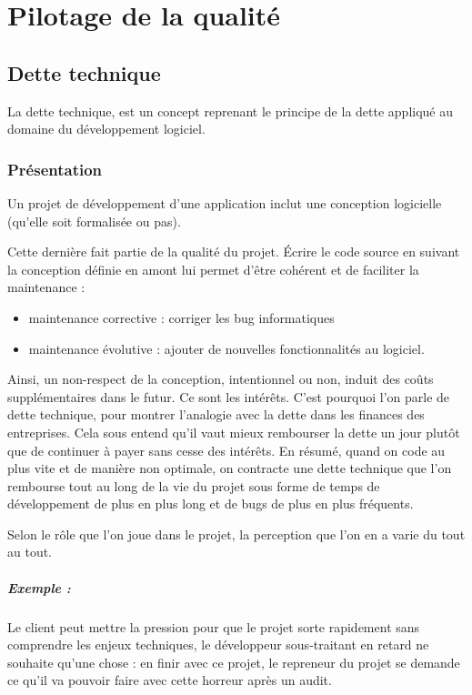 \chapter{Pilotage de la qualité}

% 

\section{Dette technique}
La dette technique, est un concept reprenant le principe de la dette appliqué au domaine du développement logiciel.

\subsection{Présentation}

Un projet de développement d'une application inclut une conception logicielle (qu'elle soit formalisée ou pas).

Cette dernière fait partie de la qualité du projet. Écrire le code source en suivant la conception définie en amont lui permet d'être cohérent et de faciliter la maintenance :

\begin{itemize}
\item maintenance corrective : corriger les bug informatiques
\item maintenance évolutive : ajouter de nouvelles fonctionnalités au logiciel. 
\end{itemize}

Ainsi, un non-respect de la conception, intentionnel ou non, induit des coûts supplémentaires dans le futur. 
Ce sont les intérêts. C'est pourquoi l'on parle de dette technique, pour montrer l'analogie avec la dette dans les finances des entreprises. 
Cela sous entend qu'il vaut mieux rembourser la dette un jour plutôt que de continuer à payer sans cesse des intérêts.
\jumpTwo
En résumé, quand on code au plus vite et de manière non optimale, on contracte une dette technique que l'on rembourse tout au long de la vie du projet sous forme de temps de développement de plus en plus long et de bugs de plus en plus fréquents.

Selon le rôle que l’on joue dans le projet, la perception que l’on en a varie du tout au tout.

\paragraph{Exemple :} Le client peut mettre la pression pour que le projet sorte rapidement sans comprendre les enjeux techniques, le développeur sous-traitant en retard ne souhaite qu’une chose : en finir avec ce projet, le repreneur du projet se demande ce qu’il va pouvoir faire avec cette horreur après un audit.

